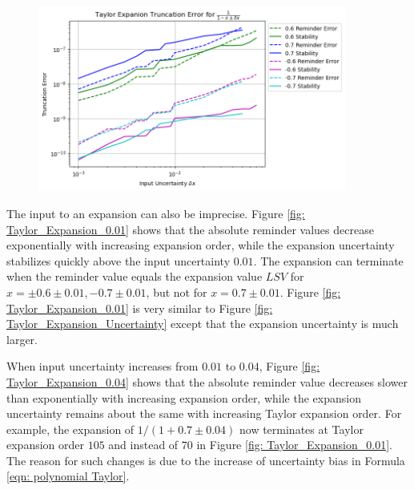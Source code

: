 \documentclass[twoside]{article}
\numberwithin{equation}{section}
\begin{document}
\begin{figure}[p]
\centering
\includegraphics[height=2.4in]{Taylor_Expansion_Error.png} 
\label{fig: Taylor_Expansion_Error}
\end{figure}


The input to an expansion can also be imprecise.
Figure \ref{fig: Taylor_Expansion_0.01} shows that the absolute reminder values decrease exponentially with increasing expansion order, while the expansion uncertainty stabilizes quickly above the input uncertainty $0.01$.  
The expansion can terminate when the reminder value equals the expansion value $LSV$ for $x=\pm 0.6 \pm 0.01, -0.7 \pm 0.01$, but not for $x=0.7 \pm 0.01$.
Figure \ref{fig: Taylor_Expansion_0.01} is very similar to Figure \ref{fig: Taylor_Expansion_Uncertainty} except that the expansion uncertainty is much larger.

When input uncertainty increases from $0.01$ to $0.04$, Figure \ref{fig: Taylor_Expansion_0.04} shows that the absolute reminder value decreases slower than exponentially with increasing expansion order, while the expansion uncertainty remains about the same with increasing Taylor expansion order.
For example, the expansion of $1/(1 + 0.7 \pm 0.04)$ now terminates at Taylor expansion order $105$ and instead of $70$ in Figure \ref{fig: Taylor_Expansion_0.01}.
The reason for such changes is due to the increase of uncertainty bias in Formula \eqref{eqn: polynomial Taylor}.
\end{document}
